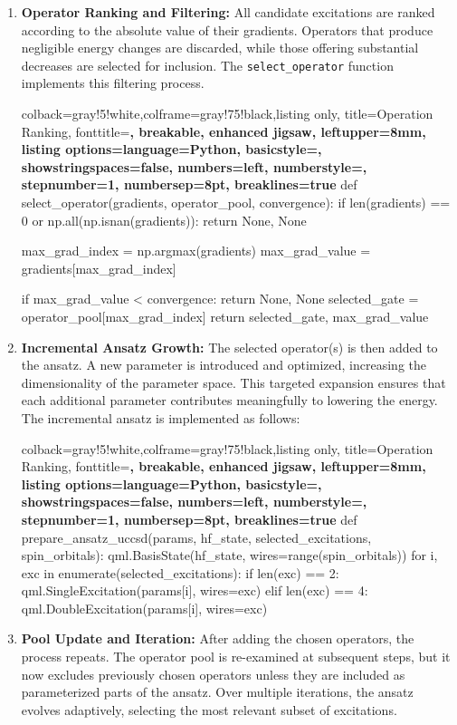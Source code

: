 \begin{enumerate}
    \item \textbf{Operator Ranking and Filtering:} All candidate excitations are ranked according to the absolute value of their gradients. Operators that produce negligible energy changes are discarded, while those offering substantial decreases are selected for inclusion. The \texttt{select\_operator} function implements this filtering process.
    \begin{tcblisting}{colback=gray!5!white,colframe=gray!75!black,listing only,
        title=Operation Ranking, fonttitle=\bfseries, breakable, enhanced jigsaw, leftupper=8mm,
        listing options={language=Python, basicstyle=\ttfamily\small,
        showstringspaces=false, numbers=left, numberstyle=\footnotesize, stepnumber=1, numbersep=8pt, breaklines=true}}
def select_operator(gradients, operator_pool, convergence):
    if len(gradients) == 0 or np.all(np.isnan(gradients)):
        return None, None

    max_grad_index = np.argmax(gradients)
    max_grad_value = gradients[max_grad_index]

    if max_grad_value < convergence:
        return None, None
    selected_gate = operator_pool[max_grad_index]
    return selected_gate, max_grad_value
      \end{tcblisting}
    \item \textbf{Incremental Ansatz Growth:} The selected operator(s) is then added to the ansatz. A new parameter is introduced and optimized, increasing the dimensionality of the parameter space. This targeted expansion ensures that each additional parameter contributes meaningfully to lowering the energy. The incremental ansatz is implemented as follows:
    \begin{tcblisting}{colback=gray!5!white,colframe=gray!75!black,listing only,
        title=Operation Ranking, fonttitle=\bfseries, breakable, enhanced jigsaw, leftupper=8mm,
        listing options={language=Python, basicstyle=\ttfamily\small,
        showstringspaces=false, numbers=left, numberstyle=\footnotesize, stepnumber=1, numbersep=8pt, breaklines=true}}
def prepare_ansatz_uccsd(params, hf_state, selected_excitations, spin_orbitals):
    qml.BasisState(hf_state, wires=range(spin_orbitals))
    for i, exc in enumerate(selected_excitations):
        if len(exc) == 2:
            qml.SingleExcitation(params[i], wires=exc)
        elif len(exc) == 4:
            qml.DoubleExcitation(params[i], wires=exc)
      \end{tcblisting}
    \item \textbf{Pool Update and Iteration:} After adding the chosen operators, the process repeats. The operator pool is re-examined at subsequent steps, but it now excludes previously chosen operators unless they are included as parameterized parts of the ansatz. Over multiple iterations, the ansatz evolves adaptively, selecting the most relevant subset of excitations.
\end{enumerate}

